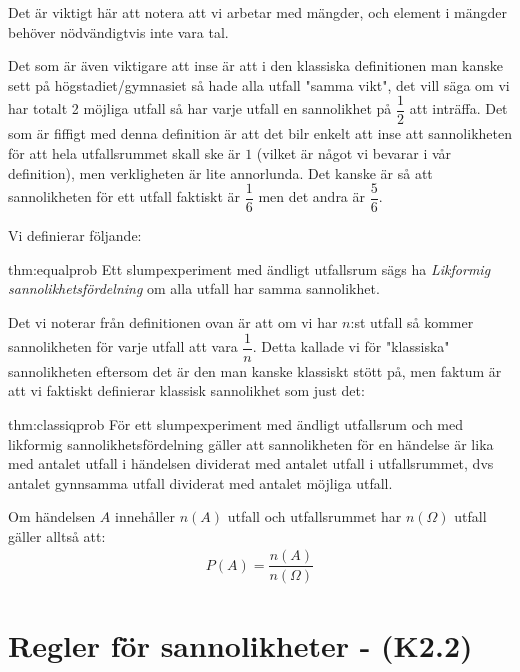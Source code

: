 \par\bigskip
\noindent Det är viktigt här att notera att vi arbetar med mängder, och element i mängder behöver nödvändigtvis inte vara tal. 
\par\bigskip
\noindent Det som är även viktigare att inse är att i den klassiska definitionen man kanske sett på högstadiet/gymnasiet så hade alla utfall "samma vikt", det vill säga om vi har totalt 2 möjliga utfall så har varje utfall en sannolikhet på $\dfrac{1}{2}$ att inträffa. Det som är fiffigt med denna definition är att det bilr enkelt att inse att sannolikheten för att hela utfallsrummet skall ske är $1$ (vilket är något vi bevarar i vår definition), men verkligheten är lite annorlunda. Det kanske är så att sannolikheten för ett utfall faktiskt är $\dfrac{1}{6}$ men det andra är $\dfrac{5}{6}$.\par
\noindent Vi definierar följande:
\par\bigskip
\begin{theo}{thm:equalprob}
  Ett slumpexperiment med ändligt utfallsrum sägs ha \textit{Likformig sannolikhetsfördelning} om alla utfall har samma sannolikhet.
\end{theo}
\par\bigskip
\noindent Det vi noterar från definitionen ovan är att om vi har $n$:st utfall så kommer sannolikheten för varje utfall att vara $\dfrac{1}{n}$. Detta kallade vi för "klassiska" sannolikheten eftersom det är den man kanske klassiskt stött på, men faktum är att vi faktiskt definierar klassisk sannolikhet som just det:
\par\bigskip
\begin{theo}{thm:classiqprob}
  För ett slumpexperiment med ändligt utfallsrum och med likformig sannolikhetsfördelning gäller att sannolikheten för en händelse är lika med antalet utfall i händelsen dividerat med antalet utfall i utfallsrummet, dvs antalet gynnsamma utfall dividerat med antalet möjliga utfall.\par
  \noindent Om händelsen $A$ innehåller $n(A)$ utfall och utfallsrummet har $n(\Omega)$ utfall gäller alltså att:
  \begin{equation*}
    \begin{gathered}
      P(A) = \dfrac{n(A)}{n(\Omega)}
    \end{gathered}
  \end{equation*}
\end{theo}

\newpage
\section{Regler för sannolikheter - (K2.2)}
\par\bigskip
